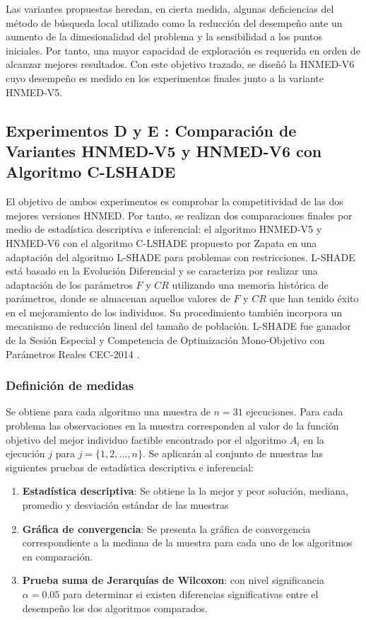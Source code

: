 Las variantes propuestas heredan, en cierta medida, algunas deficiencias del método de búsqueda local utilizado como la reducción del desempeño ante un aumento de la dimesionalidad del problema y la sensibilidad a los puntos iniciales. Por tanto, una mayor capacidad de exploración es requerida en orden de alcanzar mejores resultados. Con este objetivo trazado, se diseñó la HNMED-V6 cuyo desempeño es medido en los experimentos finales junto a la variante HNMED-V5.


\subsection{Experimentos D y E : Comparación de Variantes HNMED-V5 y HNMED-V6 con Algoritmo C-LSHADE}
El objetivo de ambos experimentos es comprobar la competitividad  de las dos mejores versiones HNMED. Por tanto, se realizan dos comparaciones finales por medio de estadística descriptiva e inferencial: el algoritmo HNMED-V5 y HNMED-V6 con el algoritmo C-LSHADE propuesto por Zapata en \cite{zapata_zapata_control_2017} una adaptación del algoritmo L-SHADE para problemas con restricciones. L-SHADE está basado en la Evolución Diferencial y se caracteriza por realizar una adaptación de los parámetros $F$ y $CR$ utilizando una memoria histórica de parámetros, donde se almacenan aquellos valores de $F$ y $CR$ que han tenido éxito en el mejoramiento de los individuos. Su procedimiento también incorpora
un mecanismo de reducción lineal del tamaño de población. L-SHADE fue ganador de la Sesión
Especial y Competencia de Optimización Mono-Objetivo con Parámetros Reales
CEC-2014 \cite{tanabe2014improving}. 
\subsubsection{Definición de medidas}
Se obtiene para cada algoritmo una muestra de $n=31$ ejecuciones. Para cada problema las observaciones en la muestra corresponden al valor de la función objetivo del mejor individuo factible encontrado por el algoritmo $A_i$ en la ejecución $j$ para $j= \{ 1,2,...,n\}$. Se aplicarán al conjunto de muestras las siguientes pruebas de estadística descriptiva e inferencial:
\begin{enumerate}
	\item \textbf{Estadística descriptiva}: Se obtiene la la mejor y peor solución, mediana, promedio y desviación estándar de las muestras
	\item \textbf{Gráfica de convergencia}: Se presenta la gráfica de convergencia correspondiente a la mediana de la muestra para cada uno de los algoritmos en comparación.
	\item \textbf{Prueba suma de Jerarquías de Wilcoxon}: con nivel significancia $\alpha=0.05$ para determinar si existen diferencias significativas entre el desempeño los dos algoritmos comparados. 
	
\end{enumerate}
